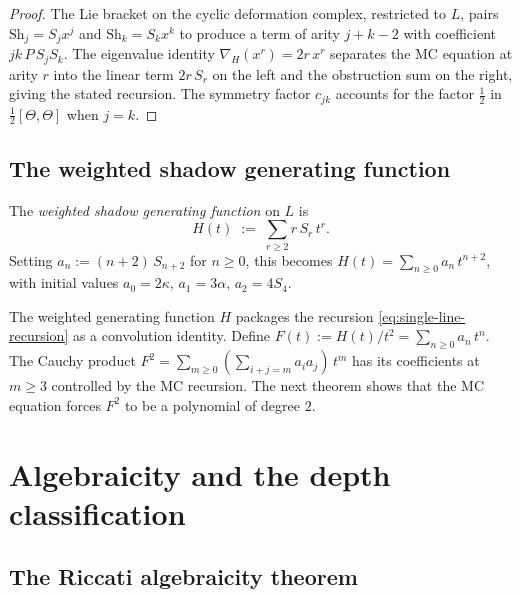 \begin{proof}
The Lie bracket on the cyclic deformation complex, restricted to
$L$, pairs $\mathrm{Sh}_j = S_j x^j$ and
$\mathrm{Sh}_k = S_k x^k$ to produce a term of arity $j + k - 2$
with coefficient $jk\,P\,S_j S_k$. The eigenvalue identity
$\nabla_H(x^r) = 2r \, x^r$ separates the MC equation at
arity $r$ into the linear term $2r \, S_r$ on the left and the
obstruction sum on the right, giving the stated recursion.
The symmetry factor $c_{jk}$ accounts for the factor
$\tfrac{1}{2}$ in $\tfrac{1}{2}[\Theta, \Theta]$ when $j = k$.
\end{proof}

\subsection{The weighted shadow generating function}

\begin{definition}
\label{def:shadow-gf}
The \emph{weighted shadow generating function} on $L$ is
\begin{equation}
\label{eq:shadow-gf}
 H(t) \;:=\; \sum_{r \geq 2} r \, S_r \, t^r.
\end{equation}
Setting $a_n := (n+2)\,S_{n+2}$ for $n \geq 0$, this becomes
$H(t) = \sum_{n \geq 0} a_n \, t^{n+2}$, with initial values
$a_0 = 2\kappa$, $a_1 = 3\alpha$, $a_2 = 4S_4$.
\end{definition}

The weighted generating function $H$ packages the recursion
\eqref{eq:single-line-recursion} as a convolution identity.
Define $F(t) := H(t)/t^2 = \sum_{n \geq 0} a_n \, t^n$.
The Cauchy product $F^2 = \sum_{m \geq 0}
(\sum_{i+j=m} a_i a_j)\, t^m$ has its coefficients at
$m \geq 3$ controlled by the MC recursion. The next theorem
shows that the MC equation forces $F^2$ to be a polynomial
of degree $2$.



\section{Algebraicity and the depth classification}
\label{sec:algebraicity}

\subsection{The Riccati algebraicity theorem}

